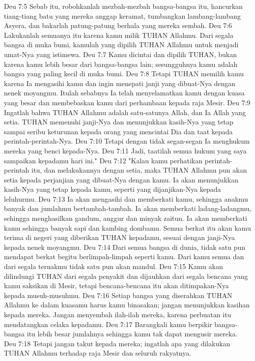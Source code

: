 Deu 7:5  Sebab itu, robohkanlah mezbah-mezbah bangsa-bangsa itu, hancurkan tiang-tiang batu yang mereka anggap keramat, tumbangkan lambang-lambang Asyera, dan bakarlah patung-patung berhala yang mereka sembah.
Deu 7:6  Lakukanlah semuanya itu karena kamu milik TUHAN Allahmu. Dari segala bangsa di muka bumi, kamulah yang dipilih TUHAN Allahmu untuk menjadi umat-Nya yang istimewa.
Deu 7:7  Kamu dicintai dan dipilih TUHAN, bukan karena kamu lebih besar dari bangsa-bangsa lain; sesungguhnya kamu adalah bangsa yang paling kecil di muka bumi.
Deu 7:8  Tetapi TUHAN memilih kamu karena Ia mengasihi kamu dan ingin menepati janji yang dibuat-Nya dengan nenek moyangmu. Itulah sebabnya Ia telah menyelamatkan kamu dengan kuasa yang besar dan membebaskan kamu dari perhambaan kepada raja Mesir.
Deu 7:9  Ingatlah bahwa TUHAN Allahmu adalah satu-satunya Allah, dan Ia Allah yang setia. TUHAN memenuhi janji-Nya dan menunjukkan kasih-Nya yang tetap sampai seribu keturunan kepada orang yang mencintai Dia dan taat kepada perintah-perintah-Nya.
Deu 7:10  Tetapi dengan tidak segan-segan Ia menghukum mereka yang benci kepada-Nya.
Deu 7:11  Jadi, taatilah semua hukum yang saya sampaikan kepadamu hari ini."
Deu 7:12  "Kalau kamu perhatikan perintah-perintah itu, dan melakukannya dengan setia, maka TUHAN Allahmu pun akan setia kepada perjanjian yang dibuat-Nya dengan kamu. Ia akan menunjukkan kasih-Nya yang tetap kepada kamu, seperti yang dijanjikan-Nya kepada leluhurmu.
Deu 7:13  Ia akan mengasihi dan memberkati kamu, sehingga anakmu banyak dan jumlahmu bertambah-tambah. Ia akan memberkati ladang-ladangmu, sehingga menghasilkan gandum, anggur dan minyak zaitun. Ia akan memberkati kamu sehingga banyak sapi dan kambing dombamu. Semua berkat itu akan kamu terima di negeri yang diberikan TUHAN kepadamu, sesuai dengan janji-Nya kepada nenek moyangmu.
Deu 7:14  Dari semua bangsa di dunia, tidak satu pun mendapat berkat begitu berlimpah-limpah seperti kamu. Dari kamu semua dan dari segala ternakmu tidak satu pun akan mandul.
Deu 7:15  Kamu akan dilindungi TUHAN dari segala penyakit dan dijauhkan dari segala bencana yang kamu saksikan di Mesir, tetapi bencana-bencana itu akan ditimpakan-Nya kepada musuh-musuhmu.
Deu 7:16  Setiap bangsa yang diserahkan TUHAN Allahmu ke dalam kuasamu harus kamu binasakan; jangan menunjukkan kasihan kepada mereka. Jangan menyembah ilah-ilah mereka, karena perbuatan itu mendatangkan celaka kepadamu.
Deu 7:17  Barangkali kamu berpikir bangsa-bangsa itu lebih besar jumlahnya sehingga kamu tak dapat mengusir mereka.
Deu 7:18  Tetapi jangan takut kepada mereka; ingatlah apa yang dilakukan TUHAN Allahmu terhadap raja Mesir dan seluruh rakyatnya.
